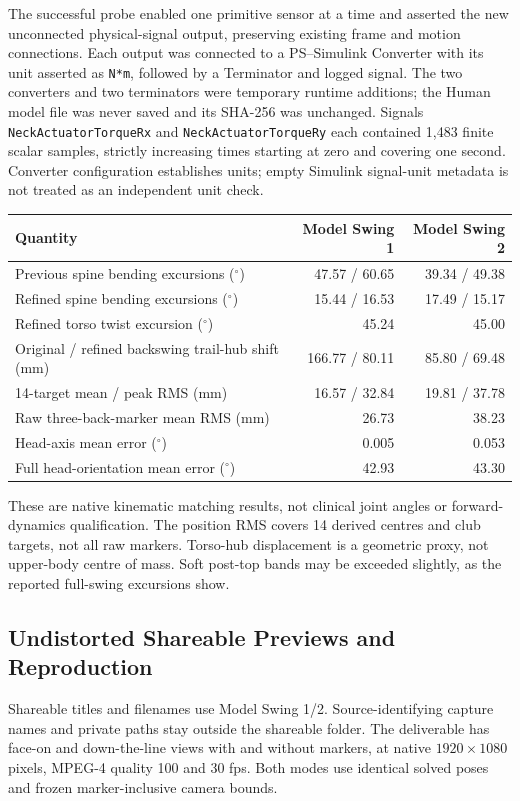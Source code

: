 \documentclass[11pt,a4paper]{article}
\begin{document}
The successful probe enabled one primitive sensor at a time and asserted the
new unconnected physical-signal output, preserving existing frame and motion
connections. Each output was connected to a PS--Simulink Converter with its
unit asserted as \texttt{N*m}, followed by a Terminator and logged signal.
The two converters and two terminators were temporary runtime additions;
the Human model file was never saved and its SHA-256 was unchanged.
Signals \texttt{NeckActuatorTorqueRx} and \texttt{NeckActuatorTorqueRy}
each contained 1,483 finite scalar samples, strictly increasing times starting
at zero and covering one second. Converter configuration establishes units;
empty Simulink signal-unit metadata is not treated as an independent unit check.

\begin{center}
\begin{tabular}{lrr}
\toprule
Quantity & Model Swing 1 & Model Swing 2 \\
\midrule
Previous spine bending excursions ($^\circ$) & 47.57 / 60.65 & 39.34 / 49.38 \\
Refined spine bending excursions ($^\circ$) & 15.44 / 16.53 & 17.49 / 15.17 \\
Refined torso twist excursion ($^\circ$) & 45.24 & 45.00 \\
Original / refined backswing trail-hub shift (mm) & 166.77 / 80.11 & 85.80 / 69.48 \\
14-target mean / peak RMS (mm) & 16.57 / 32.84 & 19.81 / 37.78 \\
Raw three-back-marker mean RMS (mm) & 26.73 & 38.23 \\
Head-axis mean error ($^\circ$) & 0.005 & 0.053 \\
Full head-orientation mean error ($^\circ$) & 42.93 & 43.30 \\
\bottomrule
\end{tabular}
\end{center}
These are native kinematic matching results, not clinical joint angles or
forward-dynamics qualification. The position RMS covers 14 derived centres
and club targets, not all raw markers. Torso-hub displacement is a geometric
proxy, not upper-body centre of mass. Soft post-top bands may be exceeded
slightly, as the reported full-swing excursions show.

\subsection{Undistorted Shareable Previews and Reproduction}
Shareable titles and filenames use Model Swing 1/2. Source-identifying
capture names and private paths stay outside the shareable folder. The
deliverable has face-on and down-the-line views with and without markers,
at native $1920\times1080$ pixels, MPEG-4 quality 100 and 30 fps. Both modes
use identical solved poses and frozen marker-inclusive camera bounds.
\end{document}
